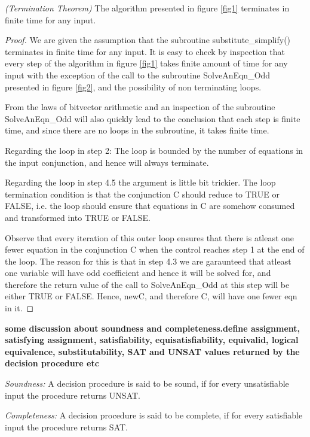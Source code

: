 \begin{theorem}
\emph{(Termination Theorem)}
\label{Termination}
The algorithm presented in figure \ref{fig1} terminates in finite time
for any input.
\end{theorem}

\begin{proof}
We are given the assumption that the subroutine substitute\_simplify()
terminates in finite time for any input. It is easy to check by
inspection that every step of the algorithm in figure \ref{fig1} takes
finite amount of time for any input with the exception of the call to
the subroutine SolveAnEqn\_Odd presented in figure \ref{fig2}, and the
possibility of non terminating loops. 

From the laws of bitvector arithmetic and an inspection of the
subroutine SolveAnEqn\_Odd will also quickly lead to the conclusion
that each step is finite time, and since there are no loops in the
subroutine, it takes finite time.

Regarding the loop in step 2: The loop is bounded by the number of
equations in the input conjunction, and hence will always terminate.

Regarding the loop in step 4.5 the argument is little bit
trickier. The loop termination condition is that the conjunction C
should reduce to TRUE or FALSE, i.e. the loop should ensure that
equations in C are somehow consumed and transformed into TRUE or
FALSE.

Observe that every iteration of this outer loop ensures that there is
atleast one fewer equation in the conjunction C when the control
reaches step 1 at the end of the loop. The reason for this is that in
step 4.3 we are garaunteed that atleast one variable will have odd
coefficient and hence it will be solved for, and therefore the return
value of the call to SolveAnEqn\_Odd at this step will be either TRUE
or FALSE. Hence, newC, and therefore C, will have one fewer eqn in it.
\end{proof}

\textbf{some discussion about soundness and completeness.define
assignment, satisfying assignment, satisfiability, equisatisfiability,
equivalid, logical equivalence, substitutability, SAT and UNSAT values
returned by the decision procedure etc}


\begin{definition}
\item \emph{Soundness:} A decision procedure is said to be sound, if
for every unsatisfiable input the procedure returns UNSAT.

\item \emph{Completeness:} A decision procedure is said to be
complete, if for every satisfiable input the procedure returns SAT.
\end{definition}

